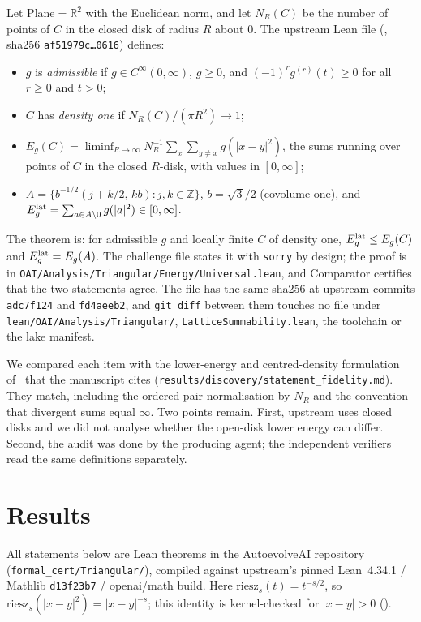 \documentclass[11pt]{article}
\newcommand{\R}{\mathbb{R}}
\newcommand{\Z}{\mathbb{Z}}
\begin{document}
Let $\mathrm{Plane}=\R^2$ with the Euclidean norm, and let $N_R(C)$ be the number of points of $C$ in the closed disk of radius $R$ about
$0$. The upstream Lean file (, sha256 \texttt{af51979c\ldots0616}) defines:
\begin{itemize}
\item $g$ is \emph{admissible} if $g\in C^\infty(0,\infty)$, $g\ge0$, and $(-1)^r g^{(r)}(t)\ge0$ for all $r\ge0$ and $t>0$;
\item $C$ has \emph{density one} if $N_R(C)/(\pi R^2)\to1$;
\item $E_g(C)=\liminf_{R\to\infty} N_R^{-1}\sum_{x}\sum_{y\neq x} g(|x-y|^2)$, the sums running over points of $C$ in the closed $R$-disk,
with values in $[0,\infty]$;
\item $A=\{b^{-1/2}(j+k/2,\,kb): j,k\in\Z\}$, $b=\sqrt3/2$ (covolume one), and $E_g^{\rm lat}=\sum_{a\in A\setminus0}g(|a|^2)\in[0,\infty]$.
\end{itemize}
The theorem is: for admissible $g$ and locally finite $C$ of density one,
$E_g^{\rm lat}\le E_g(C)$ and $E_g^{\rm lat}=E_g(A)$. The challenge file states it with \texttt{sorry} by design; the proof is in
\texttt{OAI/Analysis/Triangular/Energy/Universal.lean}, and Comparator certifies that the two statements agree. The file has the same sha256
at upstream commits \texttt{adc7f124} and \texttt{fd4aeeb2}, and \texttt{git diff} between them touches no file under
\texttt{lean/OAI/Analysis/Triangular/}, \texttt{LatticeSummability.lean}, the toolchain or the lake manifest.

We compared each item with the lower-energy and centred-density formulation of~\cite[Defs.~1.1--1.3]{ckmrv} that the manuscript cites
(\texttt{results/discovery/statement\_fidelity.md}). They match, including the ordered-pair normalisation by $N_R$ and the convention that
divergent sums equal $\infty$. Two points remain. First, upstream uses closed disks and we did not analyse whether the open-disk lower energy
can differ. Second, the audit was done by the producing agent; the independent verifiers read the same definitions separately.

\section{Results}

All statements below are Lean theorems in the AutoevolveAI repository (\texttt{formal\_cert/Triangular/}), compiled against upstream's
pinned Lean~4.34.1 / Mathlib \texttt{d13f23b7} / openai/math build. Here $\mathrm{riesz}_s(t)=t^{-s/2}$, so
$\mathrm{riesz}_s(|x-y|^2)=|x-y|^{-s}$; this identity is kernel-checked for $|x-y|>0$ ().
\end{document}
